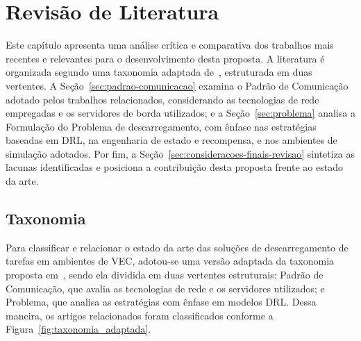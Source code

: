 \chapter{Revisão de Literatura  }
\label{cap:revisao-literatura}





Este capítulo apresenta uma análise crítica e comparativa dos trabalhos mais recentes e relevantes para o desenvolvimento desta proposta. A literatura é organizada segundo uma taxonomia adaptada de~\cite{de2020computation}, estruturada em duas vertentes. A Seção~\ref{sec:padrao-comunicacao} examina o Padrão de Comunicação adotado pelos trabalhos relacionados, considerando as tecnologias de rede empregadas e os servidores de borda utilizados; e a Seção~\ref{sec:problema} analisa a Formulação do Problema de descarregamento, com ênfase nas estratégias baseadas em \gls{DRL}, na engenharia de estado e recompensa, e nos ambientes de simulação adotados. Por fim, a Seção~\ref{sec:consideracoes-finais-revisao} sintetiza as lacunas identificadas e posiciona a contribuição desta proposta frente ao estado da arte.

\section*{Taxonomia}

Para classificar e relacionar o estado da arte das soluções de descarregamento de tarefas em ambientes de \gls{VEC}, adotou-se uma versão adaptada da taxonomia proposta em~\cite{de2020computation}, sendo ela dividida em duas vertentes estruturais: Padrão de Comunicação, que avalia as tecnologias de rede e os servidores utilizados; e Problema, que analisa as estratégias com ênfase em modelos \gls{DRL}. Dessa maneira, os artigos relacionados foram classificados conforme a Figura~\ref{fig:taxonomia_adaptada}.

